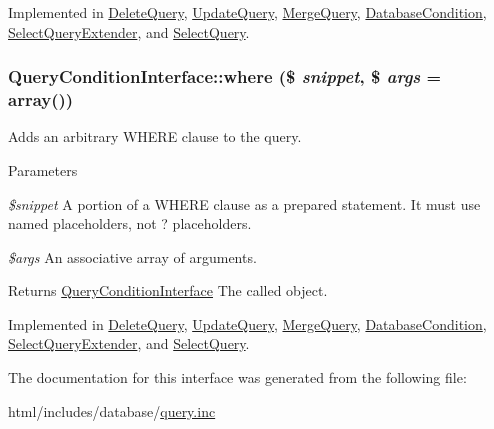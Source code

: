 Implemented in \hyperlink{classDeleteQuery_a026548cee31db2472b2b3b83c5c104c3}{DeleteQuery}, \hyperlink{classUpdateQuery_a0fdac99cf74b86a774f31848d4f98206}{UpdateQuery}, \hyperlink{classMergeQuery_a3749f7ccb2e71b8ff1570161418cbf2b}{MergeQuery}, \hyperlink{classDatabaseCondition_a435abef28b40645e5939eb521ac5407b}{DatabaseCondition}, \hyperlink{classSelectQueryExtender_a0cd2b1d2e813fc6b8280221f6ca40777}{SelectQueryExtender}, and \hyperlink{classSelectQuery_a800e7ee63d0d648483953bb6961738ca}{SelectQuery}.\hypertarget{interfaceQueryConditionInterface_a42c03c74dd81ef6d77041e67ec12e735}{
\subsubsection[{where}]{\setlength{\rightskip}{0pt plus 5cm}QueryConditionInterface::where (\$ {\em snippet}, \/  \$ {\em args} = {\ttfamily array()})}}
\label{interfaceQueryConditionInterface_a42c03c74dd81ef6d77041e67ec12e735}
Adds an arbitrary WHERE clause to the query.


\begin{DoxyParams}{Parameters}
\item[{\em \$snippet}]A portion of a WHERE clause as a prepared statement. It must use named placeholders, not ? placeholders. \item[{\em \$args}]An associative array of arguments.\end{DoxyParams}
\begin{DoxyReturn}{Returns}
\hyperlink{interfaceQueryConditionInterface}{QueryConditionInterface} The called object. 
\end{DoxyReturn}


Implemented in \hyperlink{classDeleteQuery_a1f4a560d33adeeab405fee5302a4a92e}{DeleteQuery}, \hyperlink{classUpdateQuery_a67603f742b3130dd34fd786b69de7ec1}{UpdateQuery}, \hyperlink{classMergeQuery_a1d46b2fc285ec9f402ac53800e3cd58f}{MergeQuery}, \hyperlink{classDatabaseCondition_ade864c6825d48205a1a6ec6fb1c3076f}{DatabaseCondition}, \hyperlink{classSelectQueryExtender_a7ac93a5b39a4b816e95b9c2d588ba45a}{SelectQueryExtender}, and \hyperlink{classSelectQuery_a9cd4e4c627c922318203fb1193784d18}{SelectQuery}.

The documentation for this interface was generated from the following file:\begin{DoxyCompactItemize}
\item 
html/includes/database/\hyperlink{query_8inc}{query.inc}\end{DoxyCompactItemize}
